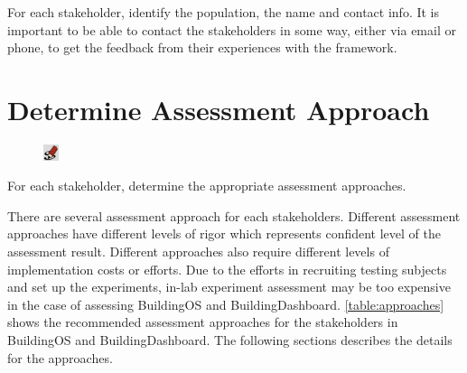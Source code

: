 \documentclass[11pt,oneside]{book}
\begin{document}
For each stakeholder, identify the population, the name and contact info. It is important to be able to contact the stakeholders in some way, either via email or phone, to get the feedback from their experiences with 
the framework.
\newline
\newline

\section{Determine Assessment Approach}
\label{sect:Assessment Approach}

\begin{shadebox}
\begin{figure}
\vspace{-15pt}\hspace{-10pt}
    \includegraphics[width=0.04\textwidth]{note-icon}
\end{figure}
For each stakeholder, determine the appropriate assessment approaches.
\end{shadebox}

There are several assessment approach for each stakeholders. Different assessment approaches have different levels of rigor which represents confident level of the assessment result. Different approaches also require different levels of implementation costs or efforts. Due to the efforts in recruiting testing subjects and set up the experiments, in-lab experiment assessment may be too expensive in the case of assessing BuildingOS and BuildingDashboard. \autoref{table:approaches} shows the recommended assessment approaches for the stakeholders in BuildingOS and BuildingDashboard. The following sections describes the details for the approaches.
 
\end{document}
